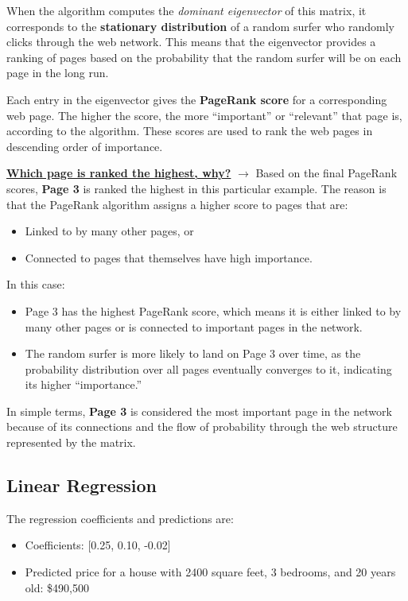 \documentclass[a4paper,12pt]{article}
\begin{document}
When the algorithm computes the \textit{dominant eigenvector} of this matrix, it corresponds to the \textbf{stationary distribution} of a random surfer who randomly clicks through the web network. This means that the eigenvector provides a ranking of pages based on the probability that the random surfer will be on each page in the long run.

Each entry in the eigenvector gives the \textbf{PageRank score} for a corresponding web page. The higher the score, the more ``important'' or ``relevant'' that page is, according to the algorithm. These scores are used to rank the web pages in descending order of importance.

\textbf{\underline{Which page is ranked the highest, why?}} $\longrightarrow$
Based on the final PageRank scores, \textbf{Page 3} is ranked the highest in this particular example. The reason is that the PageRank algorithm assigns a higher score to pages that are:
\begin{itemize}
    \item Linked to by many other pages, or
    \item Connected to pages that themselves have high importance.
\end{itemize}

In this case:
\begin{itemize}
    \item Page 3 has the highest PageRank score, which means it is either linked to by many other pages or is connected to important pages in the network.
    \item The random surfer is more likely to land on Page 3 over time, as the probability distribution over all pages eventually converges to it, indicating its higher ``importance.''
\end{itemize}

In simple terms, \textbf{Page 3} is considered the most important page in the network because of its connections and the flow of probability through the web structure represented by the matrix.

\subsection{Linear Regression}
The regression coefficients and predictions are:
\begin{itemize}
    \item Coefficients: [0.25, 0.10, -0.02]
    \item Predicted price for a house with 2400 square feet, 3 bedrooms, and 20 years old: \$490,500
\end{itemize}
\end{document}
